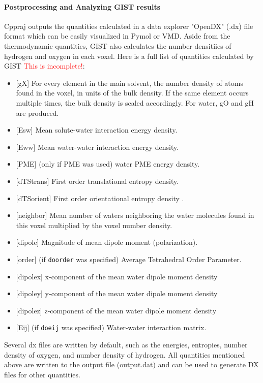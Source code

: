 \documentclass[9pt,tutorial]{livecoms}
\newcommand{\todo}{\textcolor{red}}
\newcommand\inlinecode{\texttt}
\begin{document}
\paragraph{Postprocessing and Analyzing GIST results}
Cppraj outputs the quantities calculated in a data explorer "OpenDX" (.dx) file format which can be easily visualized in Pymol or VMD.
Aside from the thermodynamic quantities, GIST also calculates the number densitiies of hydrogen and oxygen in each voxel. Here is a full list of quantities calculated by GIST \todo{This is incomplete!}:

\begin{itemize}
	\item{[gX] For every element in the main solvent, the number density of atoms found in the voxel, in units of the bulk density. If the same element occurs multiple times, the bulk density is scaled accordingly. For water, gO and gH are produced.}
	\item{[Esw] Mean solute-water interaction energy density.}
	\item{[Eww] Mean water-water interaction energy density.}
	\item{[PME] (only if PME was used) water PME energy density.}
	\item{[dTStrans] First order translational entropy density.}
	\item{[dTSorient] First order orientational entropy density .}
	\item{[neighbor] Mean number of waters neighboring the water molecules found in this voxel multiplied by the voxel number density.}
	\item{[dipole] Magnitude of mean dipole moment (polarization).}
	\item{[order] (if \inlinecode{doorder} was specified) Average Tetrahedral Order Parameter.}
	\item{[dipolex] x-component of the mean water dipole moment density}
	\item{[dipoley] y-component of the mean water dipole moment density}
	\item{[dipolez] z-component of the mean water dipole moment density}
	\item{[Eij] (if \inlinecode{doeij} was specified) Water-water interaction matrix.}
\end{itemize}

Several dx files are written by default, such as the energies, entropies, number density of oxygen, and number density of hydrogen. All quantities mentioned above are written to the output file (output.dat) and can be used to generate DX files for other quantities.
\end{document}
